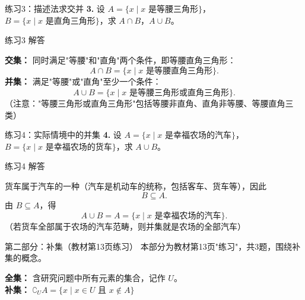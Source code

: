 \documentclass[10pt,aspectratio=169,serif]{beamer}
\begin{document}
\begin{frame}[t]{练习3：描述法求交并}
\textbf{3.} 设 $A = \{x \mid x \text{ 是等腰三角形}\}$，$B = \{x \mid x \text{ 是直角三角形}\}$，求 $A \cap B$，$A \cup B$。
\end{frame}

\begin{frame}[t]{练习3 解答}
\begin{tcolorbox}[colback=orange!10,colframe=orange,title=\textbf{解}]
\textbf{交集：} 同时满足"等腰"和"直角"两个条件，即等腰直角三角形：
\[
A \cap B = \{x \mid x \text{ 是等腰直角三角形}\}.
\]
\textbf{并集：} 满足"等腰"或"直角"至少一个条件：
\[
A \cup B = \{x \mid x \text{ 是等腰三角形或直角三角形}\}.
\]
\vspace{0.5em}
\small（注意："等腰三角形或直角三角形"包括等腰非直角、直角非等腰、等腰直角三类）
\end{tcolorbox}
\end{frame}

\begin{frame}[t]{练习4：实际情境中的并集}
\textbf{4.} 设 $A = \{x \mid x \text{ 是幸福农场的汽车}\}$，$B = \{x \mid x \text{ 是幸福农场的货车}\}$，求 $A \cup B$。
\end{frame}

\begin{frame}[t]{练习4 解答}
\begin{tcolorbox}[colback=orange!10,colframe=orange,title=\textbf{解}]
货车属于汽车的一种（汽车是机动车的统称，包括客车、货车等），因此
\[
B \subseteq A.
\]
由 $B \subseteq A$，得
\[
A \cup B = A = \{x \mid x \text{ 是幸福农场的汽车}\}.
\]
\vspace{0.5em}
\small（若货车全部属于农场的汽车范畴，则并集就是农场的全部汽车）
\end{tcolorbox}
\end{frame}

\begin{frame}[t]{第二部分：补集（教材第13页练习）}
本部分为教材第13页"练习"，共3题，围绕\alert{补集}的概念。

\vspace{1em}
\begin{tcolorbox}[colback=blue!5,colframe=blue,title=\textbf{全集与补集}]
\textbf{全集：} 含研究问题中所有元素的集合，记作 $U$。\\[0.3em]
\textbf{补集：} $\complement_U A = \{x \mid x \in U \text{ 且 } x \notin A\}$
\end{tcolorbox}
\end{frame}
\end{document}
